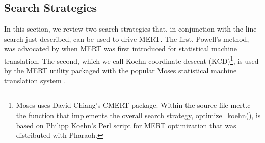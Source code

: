 \documentclass[11pt]{article}
\begin{document}
    
\subsection{Search Strategies}

In this section, we review two search strategies that, in conjunction with the line search just described, can be used to drive MERT. The first, Powell's method, was advocated by  when MERT was first introduced for statistical machine translation. The second, which we call Koehn-coordinate descent (KCD)\footnote{Moses uses David Chiang's CMERT package. Within the source file mert.c the function that implements the overall search strategy, optimize\_koehn(), is based on Philipp Koehn's Perl script for MERT optimization that was distributed with Pharaoh. }, is used by the MERT utility packaged with the popular Moses statistical machine translation system \cite{koehn2007}. 
\end{document}
